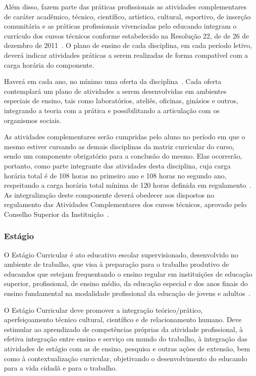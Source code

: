 \documentclass[11pt,fleqn]{book} %
\begin{document}
Além disso, fazem parte das práticas profissionais as atividades complementares de caráter acadêmico, técnico, científico, artístico, cultural, esportivo, de inserção comunitária e as práticas profissionais vivenciadas pelo educando integram o currículo dos cursos técnicos conforme estabelecido na Resolução 22, de de 26 de dezembro de 2011~\cite{Resolucao22De2011}.
O plano de ensino de cada disciplina, em cada período letivo, deverá indicar atividades práticas a serem realizadas de forma compatível com a carga horária do componente.

Haverá em cada ano, no mínimo uma oferta da disciplina~. 
Cada oferta contemplará um plano de atividades a serem desenvolvidas em ambientes especiais de ensino, tais como laboratórios, ateliês, oficinas, ginásios e outros, integrando a teoria com a prática e possibilitando a articulação com os organismos sociais.

As atividades complementares serão cumpridas pelo aluno no período em que o mesmo estiver cursando as demais disciplinas da matriz curricular do curso, sendo um componente obrigatório para a conclusão do mesmo.
Elas ocorrerão, portanto, como parte integrante das atividades desta disciplina, cuja carga horária total é de 108 horas no primeiro ano e 108 horas no segundo ano, respeitando a carga horária total mínima de 120 horas definida em regulamento~\cite{Resolucao20De2011}.
As integralização deste componente deverá obedecer aos dispostos no regulamento das Atividades Complementares dos cursos técnicos, aprovado pelo Conselho Superior da Instituição~\cite{Resolucao20De2011}.

\subsubsection{Estágio}
\indent

O Estágio Curricular é ato educativo escolar supervisionado, desenvolvido no ambiente de trabalho, que visa à preparação para o trabalho produtivo de educandos que estejam frequentando o ensino regular em instituições de educação superior, profissional, de ensino médio, da educação especial e dos anos finais do ensino fundamental na modalidade profissional da educação de jovens e adultos~\cite{Lei11788De2008}.

O Estágio Curricular deve promover a integração teórico/prático, aperfeiçoamento técnico cultural, científico e de relacionamento humano.  
Deve estimular ao aprendizado de competências próprias da atividade profissional, à efetiva integração entre ensino e serviço ou mundo do trabalho, à integração das atividades de estágio com as de ensino, pesquisa e outras ações de extensão, bem como à contextualização curricular, objetivando o desenvolvimento do educando para a vida cidadã e para o trabalho.
\end{document}

